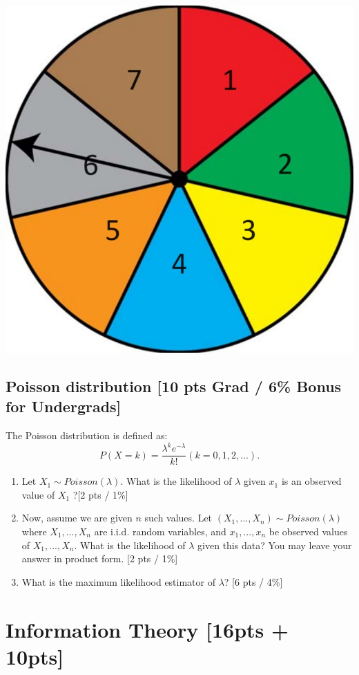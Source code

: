 \documentclass{article}
\begin{document}
\begin{center}
    \includegraphics[origin=c,scale=.5]{spinner.jpg} 
\end{center}
\newpage

\subsection{Poisson distribution [10 pts Grad / 6\% Bonus for Undergrads]}
The Poisson distribution is defined as:
$$P(X=k)=\frac{\lambda^k e^{-\lambda}}{k!} (k=0,1,2,...).$$
\begin{enumerate}[label=(\alph*)]
    \item Let $X_1 \sim Poisson(\lambda)$. What is the likelihood of $\lambda$ given $x_1$ is an observed value of $X_1$ ?[2 pts / 1\%]
    \item Now, assume we are given $n$ such values. Let $(X_1, ...,X_n)\sim Poisson(\lambda)$ where $X_1, ...,X_n$ are i.i.d. random variables, and $x_1,...,x_n$ be observed values of $X_1, ...,X_n$. What is the likelihood of $\lambda$ given this data? You may leave your answer in product form. [2 pts / 1\%]
    \item What is the maximum likelihood estimator of $\lambda$? [6 pts / 4\%]
\end{enumerate}
\newpage

\section{Information Theory [16pts + 10pts]}
\end{document}
